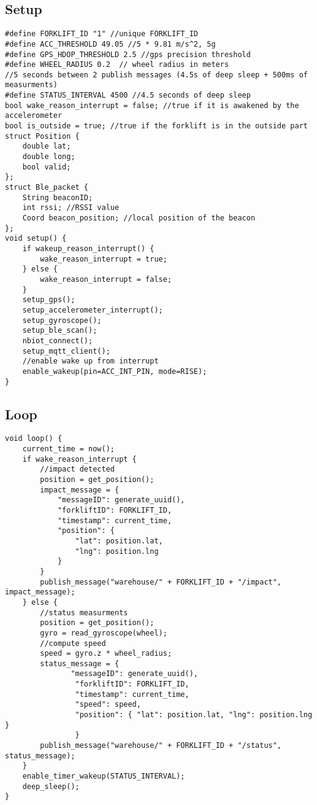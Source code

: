\subsection{Setup}
\begin{verbatim}
#define FORKLIFT_ID "1" //unique FORKLIFT_ID 
#define ACC_THRESHOLD 49.05 //5 * 9.81 m/s^2, 5g
#define GPS_HDOP_THRESHOLD 2.5 //gps precision threshold 
#define WHEEL_RADIUS 0.2  // wheel radius in meters
//5 seconds between 2 publish messages (4.5s of deep sleep + 500ms of measurments)
#define STATUS_INTERVAL 4500 //4.5 seconds of deep sleep
bool wake_reason_interrupt = false; //true if it is awakened by the accelerometer
bool is_outside = true; //true if the forklift is in the outside part
struct Position {
    double lat;
    double long;
    bool valid;
};
struct Ble_packet {
    String beaconID;
    int rssi; //RSSI value
    Coord beacon_position; //local position of the beacon
};
void setup() {
    if wakeup_reason_interrupt() {
        wake_reason_interrupt = true;
    } else {
        wake_reason_interrupt = false;
    } 
    setup_gps();
    setup_accelerometer_interrupt();
    setup_gyroscope();
    setup_ble_scan();
    nbiot_connect();
    setup_mqtt_client();
    //enable wake up from interrupt
    enable_wakeup(pin=ACC_INT_PIN, mode=RISE);
}
\end{verbatim}
\pagebreak
\subsection{Loop}
\begin{verbatim}
void loop() {
    current_time = now();
    if wake_reason_interrupt {
        //impact detected
        position = get_position();
        impact_message = {
            "messageID": generate_uuid(),
            "forkliftID": FORKLIFT_ID,
            "timestamp": current_time,
            "position": {
                "lat": position.lat,
                "lng": position.lng
            }
        }
        publish_message("warehouse/" + FORKLIFT_ID + "/impact", impact_message);
    } else {
        //status measurments
        position = get_position();
        gyro = read_gyroscope(wheel);
        //compute speed
        speed = gyro.z * wheel_radius;
        status_message = {
               "messageID": generate_uuid(),
                "forkliftID": FORKLIFT_ID,
                "timestamp": current_time,
                "speed": speed,
                "position": { "lat": position.lat, "lng": position.lng }
                }
        publish_message("warehouse/" + FORKLIFT_ID + "/status", status_message);
    }
    enable_timer_wakeup(STATUS_INTERVAL);
    deep_sleep();
}
\end{verbatim}
\pagebreak
